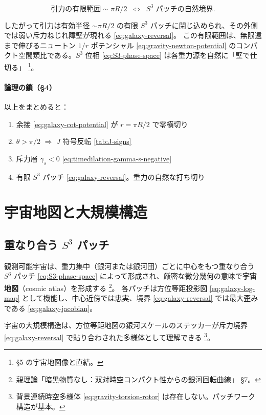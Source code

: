 \documentclass[dvipdfmx,a4paper,oneside]{jsbook}
\numberwithin{equation}{chapter}
\begin{document}
\begin{equation}
  \boxed{\;
  \text{引力の有限範囲} \sim \pi R/2
  \;\;\Longleftrightarrow\;\;
  S^3 \text{ パッチの自然境界}.
  \;}
  \label{eq:galaxy-reversal}
\end{equation}

したがって引力は有効半径 \(\sim \pi R/2\) の有限 \(S^3\) パッチに閉じ込められ、その外側では弱い斥力ねじれ障壁が現れる \eqref{eq:galaxy-reversal}。
この有限範囲は、無限遠まで伸びるニュートン \(1/r\) ポテンシャル \eqref{eq:gravity-newton-potential} のコンパクト空間類比である。\(S^3\) 位相 \eqref{eq:S3-phase-space} は各重力源を自然に「壁で仕切る」 \footnote{§5 の宇宙地図像と直結。}。

\paragraph{論理の鎖（§4）}
以上をまとめると：
\begin{enumerate}[leftmargin=2em]
  \item 余接 \eqref{eq:galaxy-cot-potential} が \(r = \pi R/2\) で零横切り
  \item \(\theta > \pi/2\) \(\Rightarrow\) \(J\) 符号反転 \eqref{tab:J-signs}
  \item 斥力層 \(\gamma_s < 0\) \eqref{eq:timedilation-gamma-s-negative}
  \item 有限 \(S^3\) パッチ \eqref{eq:galaxy-reversal}。重力の自然な打ち切り
\end{enumerate}

\section{宇宙地図と大規模構造}

\subsection{重なり合う \(S^3\) パッチ}

観測可能宇宙は、重力集中（銀河または銀河団）ごとに中心をもつ重なり合う \(S^3\) パッチ \eqref{eq:S3-phase-space} によって形成され、厳密な微分幾何の意味で\textbf{宇宙地図}（cosmic atlas）を形成する \footnote{\hyperref[sec:sister-manuscripts]{親理論}「暗黒物質なし：双対時空コンパクト性からの銀河回転曲線」 §7。}。
各パッチは方位等距投影図 \eqref{eq:galaxy-log-map} として機能し、中心近傍では忠実、境界 \eqref{eq:galaxy-reversal} では最大歪みである \eqref{eq:galaxy-jacobian}。

宇宙の大規模構造は、方位等距地図の銀河スケールのステッカーが斥力境界 \eqref{eq:galaxy-reversal} で貼り合わされた多様体として理解できる \footnote{背景連続時空多様体 \eqref{eq:gravity-torsion-rotor} は存在しない。パッチワーク構造が基本。}。
\end{document}
